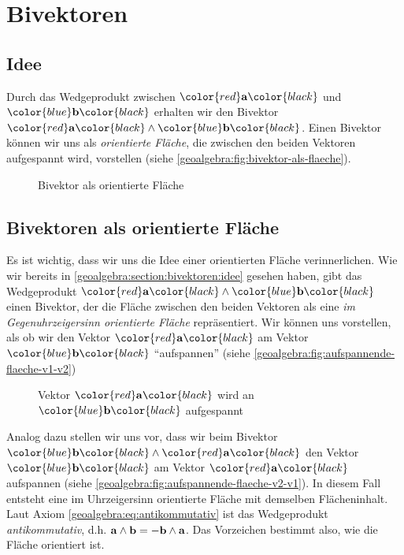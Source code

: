 
\section{Bivektoren
\label{geoalgebra:section:bivektoren}}
\subsection{Idee}
\label{geoalgebra:section:bivektoren:idee}
\newcommand{\acolored}{\color{red}\a\color{black}}
\newcommand{\bcolored}{\color{blue}\b\color{black}}
Durch das Wedgeprodukt zwischen $\acolored$ und $\bcolored$ erhalten wir
den
Bivektor $\acolored \wedge \bcolored$. Einen Bivektor können wir uns als \emph{orientierte Fläche}, die zwischen den beiden Vektoren aufgespannt
wird, vorstellen (siehe \autoref{geoalgebra:fig:bivektor-als-flaeche}).
\begin{figure}
  \begin{center}

  \end{center}
  \caption{Bivektor als orientierte Fläche}\label{geoalgebra:fig:bivektor-als-flaeche}
\end{figure}

\subsection{Bivektoren als orientierte Fläche}
Es ist wichtig, dass wir uns die Idee einer orientierten Fläche
verinnerlichen. Wie wir bereits in \autoref{geoalgebra:section:bivektoren:idee} gesehen haben,
gibt das Wedgeprodukt $\acolored \wedge \bcolored$
einen Bivektor, der die Fläche zwischen den beiden Vektoren als
eine \emph{im Gegenuhrzeigersinn orientierte Fläche} repräsentiert.
Wir können uns vorstellen, als ob wir den Vektor $\acolored$
am Vektor $\bcolored$ ``aufspannen'' (siehe \autoref{geoalgebra:fig:aufspannende-flaeche-v1-v2})

\begin{figure}
\begin{center}


\end{center}
  \caption{Vektor $\acolored$ wird an $\bcolored$ aufgespannt}\label{geoalgebra:fig:aufspannende-flaeche-v1-v2}
\end{figure}


Analog dazu stellen wir uns vor, dass wir beim Bivektor $\bcolored \wedge \acolored$ den Vektor
$\bcolored$ am Vektor $\acolored$ aufspannen (siehe \autoref{geoalgebra:fig:aufspannende-flaeche-v2-v1}).
In diesem Fall entsteht eine im Uhrzeigersinn orientierte Fläche mit demselben
Flächeninhalt. Laut Axiom \eqref{geoalgebra:eq:antikommutativ} ist das Wedgeprodukt
\emph{antikommutativ}, d.h. $\mathbf{a} \wedge \mathbf{b} = -\mathbf{b} \wedge \mathbf{a}$. Das Vorzeichen bestimmt also,
wie die Fläche orientiert ist.


